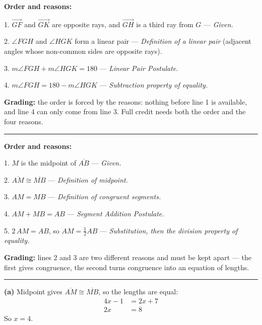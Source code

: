 \documentclass[12pt]{article}
\begin{document}



\textbf{Order and reasons:}

1. $\overrightarrow{GF}$ and $\overrightarrow{GK}$ are opposite rays, and $\overrightarrow{GH}$ is a third ray from $G$ --- \emph{Given.}

2. $\angle FGH$ and $\angle HGK$ form a linear pair --- \emph{Definition of a linear pair} (adjacent angles whose non-common sides are opposite rays).

3. $m\angle FGH + m\angle HGK = 180$ --- \emph{Linear Pair Postulate.}

4. $m\angle FGH = 180 - m\angle HGK$ --- \emph{Subtraction property of equality.}

\textbf{Grading:} the order is forced by the reasons: nothing before line 1 is available, and line 4 can only come from line 3. Full credit needs both the order and the four reasons.

\vspace{0.2cm}\noindent\rule{\linewidth}{0.2pt}


\textbf{Order and reasons:}

1. $M$ is the midpoint of $\overline{AB}$ --- \emph{Given.}

2. $\overline{AM} \cong \overline{MB}$ --- \emph{Definition of midpoint.}

3. $AM = MB$ --- \emph{Definition of congruent segments.}

4. $AM + MB = AB$ --- \emph{Segment Addition Postulate.}

5. $2\,AM = AB$, so $AM = \frac{1}{2}AB$ --- \emph{Substitution, then the division property of equality.}

\textbf{Grading:} lines 2 and 3 are two different reasons and must be kept apart --- the first gives congruence, the second turns congruence into an equation of lengths.

\vspace{0.2cm}\noindent\rule{\linewidth}{0.2pt}


\textbf{(a)} Midpoint gives $\overline{AM} \cong \overline{MB}$, so the lengths are equal:
\begin{align*}
  4x - 1 &= 2x + 7 \\
  2x &= 8
\end{align*}
So $x = 4$. 
\end{document}
